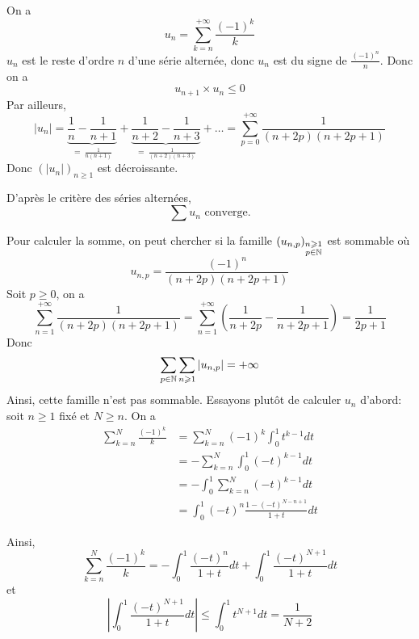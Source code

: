 \begin{solution}
	\item On a 
	$$u_{n}=\sum_{k=n}^{+\infty}\frac{(-1)^{k}}{k}$$
	$u_{n}$ est le reste d'ordre $n$ d'une série alternée, donc $u_{n}$ est du signe de $\frac{(-1)^{n}}{n}$. Donc on a 
	$$u_{n+1}\times u_{n}\leqslant0$$
	Par ailleurs,
	$$\vert u_{n}\vert=\underbrace{\frac{1}{n}-\frac{1}{n+1}}_{=~\frac{1}{n(n+1)}}+\underbrace{\frac{1}{n+2}-\frac{1}{n+3}}_{=~\frac{1}{(n+2)(n+3)}}+\dots=\sum_{p=0}^{+\infty}\frac{1}{(n+2p)(n+2p+1)}$$
	Donc $(\vert u_{n}\vert)_{n\geqslant1}$ est décroissante.

	D'après le critère des séries alternées, 
	$$\boxed{\sum u_{n}\text{ converge.}}$$

	Pour calculer la somme, on peut chercher si la famille $(u_{n,p})_{\substack{n\geqslant1\\p\in\mathbb{N}}}$ est sommable où
	$$u_{n,p}=\frac{(-1)^{n}}{(n+2p)(n+2p+1)}$$ 
	Soit $p\geqslant0$, on a 
	$$\sum_{n=1}^{+\infty}\frac{1}{(n+2p)(n+2p+1)}=\sum_{n=1}^{+\infty}\left(\frac{1}{n+2p}-\frac{1}{n+2p+1}\right)=\frac{1}{2p+1}$$
	Donc 
	$$\sum_{p\in\mathbb{N}}\sum_{n\geqslant1}\vert u_{n,p}\vert=+\infty$$
	Ainsi, cette famille n'est pas sommable. Essayons plutôt de calculer $u_{n}$ d'abord: soit $n\geqslant1$ fixé et $N\geqslant n$. On a 
	\begin{align*}
		\sum_{k=n}^{N}\frac{(-1)^{k}}{k}
		&=\sum_{k=n}^{N}(-1)^{k}\int_{0}^{1}t^{k-1}dt\\
		&=-\sum_{k=n}^{N}\int_{0}^{1}(-t)^{k-1}dt\\
		&=-\int_{0}^{1}\sum_{k=n}^{N}(-t)^{k-1}dt\\
		&=\int_{0}^{1}(-t)^{n}\frac{1-(-t)^{N-n+1}}{1+t}dt
	\end{align*}

	Ainsi, 
	$$\sum_{k=n}^{N}\frac{(-1)^{k}}{k}=-\int_{0}^{1}\frac{(-t)^{n}}{1+t}dt+\int_{0}^{1}\frac{(-t)^{N+1}}{1+t}dt$$
	et 
	$$\left\vert\int_{0}^{1}\frac{(-t)^{N+1}}{1+t}dt\right\vert\leqslant\int_{0}^{1}t^{N+1}dt=\frac{1}{N+2}$$


\end{solution}
